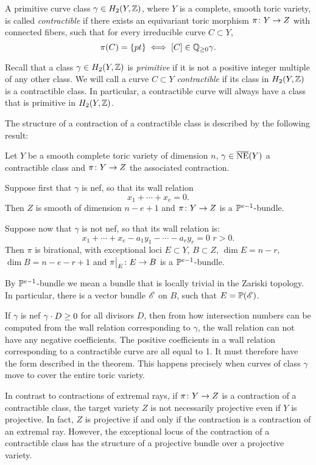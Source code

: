 \begin{definition}
  A primitive curve class $\gamma \in H_2(Y,\Z)$, where $Y$ is a complete, smooth toric variety, is called \emph{contractible} if there exists an equivariant toric morphism $\pi \from Y \to Z$ with connected fibers, such that for every irreducible curve $C \subset Y$,
\[ \pi(C) = \set{pt} \iff [C] \in \Q_{\geq 0}\gamma . \]
\end{definition}
Recall that a class $\gamma \in H_2(Y,\Z)$ is \emph{primitive} if it is not a positive integer multiple of any other class. We will call a curve $C \subset Y$ \emph{contractible} if its class in  $H_2(Y,\Z)$ is a contractible class. In particular, a contractible curve will always have a class that is primitive in $H_2(Y,\Z)$.


The structure of a contraction of a  contractible class is described by the following result:
\begin{proposition}
  \label{prop:ContractionStructure1}
  Let $Y$ be a smooth complete toric variety of dimension $n$,  $\gamma \in \NE(Y)$ a contractible class and $\pi \from Y \to Z$ the associated contraction.

Suppose first that $\gamma$ is nef, so that its wall relation
\[x_1 + \cdots + x_e = 0. \]
Then $Z$ is smooth of dimension $n-e+1$ and $\pi \from Y \to Z$ is a $\P^{e-1}$-bundle.

Suppose now that $\gamma$ is not nef, so that its wall relation is:
\[x_1 + \cdots + x_e - a_1 y_1 - \cdots - a_r y_r = 0 \, \, r > 0 .\]
Then $\pi$ is birational, with exceptional loci $E \subset Y$, $B \subset Z$, $\dim E = n-r$, $\dim B = n-e-r + 1$ and $\restr{\pi}{E} \from E \to B$ is a $\P^{e-1}$-bundle.
\end{proposition}
 By $\P^{e-1}$-bundle we mean a bundle that is locally trivial in the Zariski topology. In particular, there is a vector bundle $\sE$ on $B$, such that $E = \P(\sE)$.
\begin{remark}
  If $\gamma$ is nef \ie $\gamma \insec D \geq 0$ for all divisors $D$, then from how intersection numbers can be computed from the wall relation corresponding to $\gamma$, the wall relation can not have any negative coefficients. The positive coefficients in a wall relation corresponding to a  contractible curve are all equal to 1. It must therefore have the form described in the theorem. This happens precisely when curves of class $\gamma$ move to cover the entire toric variety.
\end{remark}
In contrast to contractions of extremal rays, if $\pi \from Y \to Z$ is a contraction of a contractible class, the target variety $Z$ is not necessarily projective even if $Y$ is projective. In fact, $Z$ is projective if and only if the contraction is a contraction of an extremal ray. However, the exceptional locus of the contraction of a contractible class has the structure of a projective bundle over a projective variety.

